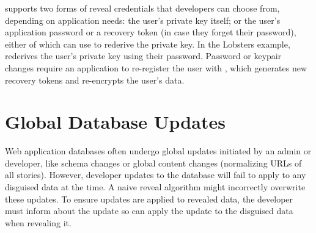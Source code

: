 %
\sys supports two forms of reveal credentials that developers can choose
from, depending on application needs: \one{} the user's private key
itself; or \two{} the user's application password or a recovery token (in case
they forget their password), either of which \sys can use to rederive the
private key.
%
%
In the Lobsters example, \sys rederives the user's private key using their password.
%
%
%
Password or keypair changes require an application to re-register the user with
\sys, which generates new recovery tokens and re-encrypts the user's \xxed data.
%
%
%
%

%
%

\section{Global Database Updates} 
\label{s:overview:updates}

Web application databases often undergo global updates 
initiated by an admin or developer, like schema changes or global content
changes (\eg normalizing URLs of all stories). 
%
However, developer updates to the database will fail to apply to any disguised
data at the time. A naive reveal algorithm might incorrectly overwrite these
updates.
%
To ensure updates are applied to revealed data, the developer must inform \sys
about the update so \sys can apply the update to the disguised data when
revealing it.

